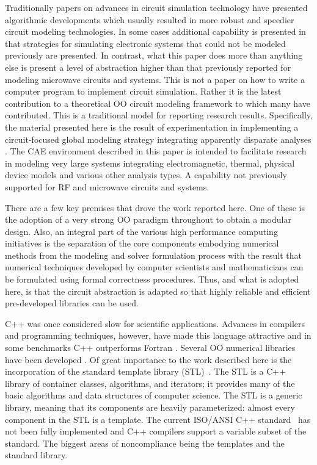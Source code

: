 Traditionally papers on advances in circuit simulation technology have
presented algorithmic developments which usually resulted in more
robust and speedier circuit modeling technologies.  In some cases
additional capability is presented in that strategies for simulating
electronic systems that could not be modeled previously are
presented. In contrast, what this paper does more than anything else
is present a level of abstraction higher than that previously reported
for modeling microwave circuits and systems. This is not a paper on
how to write a computer program to implement circuit
simulation. Rather it is the latest contribution to a theoretical OO
circuit modeling framework to which many have contributed.  This is a
traditional model for reporting research results.  Specifically, the
material presented here is the result of experimentation in
implementing a circuit-focused global modeling strategy integrating
apparently disparate analyses \cite{steer:global:1999}.  The CAE
environment described in this paper is intended to facilitate research
in modeling very large systems integrating electromagnetic, thermal,
physical device models and various other analysis types. A capability
not previously supported for RF and microwave circuits and systems.

There are a few key premises that drove the work reported here. One of
these is the adoption of a very strong OO paradigm throughout to
obtain a modular design.  Also, an integral part of the various high
performance computing initiatives is the separation of the core
components embodying numerical methods from the modeling and solver
formulation process with the result that numerical techniques
developed by computer scientists and mathematicians can be formulated
using formal correctness procedures. Thus, and what is adopted here,
is that the circuit abstraction is adapted so that highly reliable and
efficient pre-developed libraries can be used.


C++ was once considered slow for scientific applications.  Advances in
compilers and programming techniques, however, have made this language
attractive and in some benchmarks C++ outperforms Fortran
\cite{kai,c++fortran}. Several OO numerical libraries have been
developed \cite{oonpage}.  Of great importance to the work described
here is the incorporation of the standard template library
(STL)~\cite{STL}. The STL is a C++ library of container classes,
algorithms, and iterators; it provides many of the basic algorithms
and data structures of computer science. The STL is a generic library,
meaning that its components are heavily parameterized: almost every
component in the STL is a template.  The current ISO/ANSI C++
standard~\cite{todd} has not been fully implemented and C++ compilers
support a variable subset of the standard. The biggest areas of
noncompliance being the templates and the standard library.

